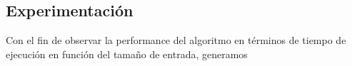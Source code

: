 \subsection{Experimentación}

Con el fin de observar la performance del algoritmo en términos de tiempo de ejecución en función del tamaño de entrada, generamos 
